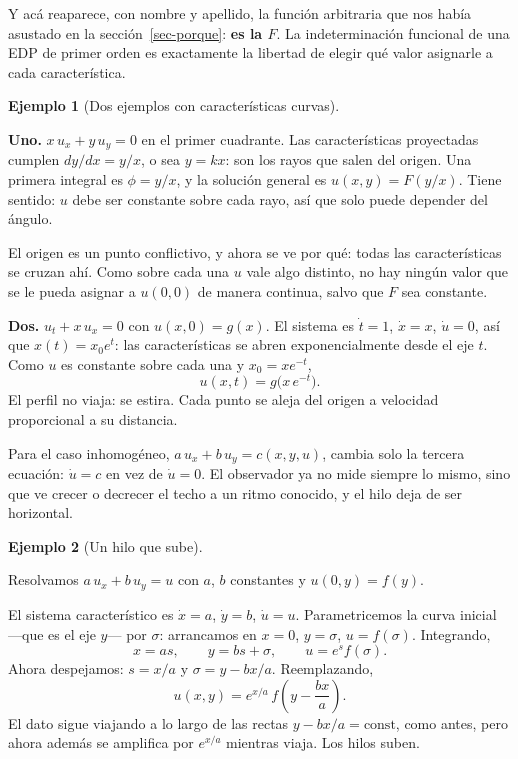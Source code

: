 \documentclass[
  spanish,
  a4paper,
]{scrbook}
\theoremstyle{definition}
\theoremstyle{plain}
\theoremstyle{definition}
\newtheorem{example}{Ejemplo}[chapter]
\theoremstyle{plain}
\theoremstyle{definition}
\theoremstyle{remark}
\begin{document}
Y acá reaparece, con nombre y apellido, la función arbitraria que nos
había asustado en la sección~\ref{sec-porque}: \textbf{es la \(F\)}. La
indeterminación funcional de una EDP de primer orden es exactamente la
libertad de elegir qué valor asignarle a cada característica.

\begin{example}[Dos ejemplos con características
curvas]\protect\hypertarget{exm-coef-variables}{}\label{exm-coef-variables}

\textbf{Uno.} \(x\,u_x + y\,u_y = 0\) en el primer cuadrante. Las
características proyectadas cumplen \(dy/dx = y/x\), o sea \(y = kx\):
son los rayos que salen del origen. Una primera integral es
\(\phi = y/x\), y la solución general es \(u(x,y) = F(y/x)\). Tiene
sentido: \(u\) debe ser constante sobre cada rayo, así que solo puede
depender del ángulo.

El origen es un punto conflictivo, y ahora se ve por qué: todas las
características se cruzan ahí. Como sobre cada una \(u\) vale algo
distinto, no hay ningún valor que se le pueda asignar a \(u(0,0)\) de
manera continua, salvo que \(F\) sea constante.

\textbf{Dos.} \(u_t + x\,u_x = 0\) con \(u(x,0)=g(x)\). El sistema es
\(\dot t = 1\), \(\dot x = x\), \(\dot u = 0\), así que
\(x(t) = x_0 e^{t}\): las características se abren exponencialmente
desde el eje \(t\). Como \(u\) es constante sobre cada una y
\(x_0 = x e^{-t}\), \[
u(x,t) = g\big(x\,e^{-t}\big) .
\] El perfil no viaja: se estira. Cada punto se aleja del origen a
velocidad proporcional a su distancia.

\end{example}

Para el caso inhomogéneo, \(a\,u_x + b\,u_y = c(x,y,u)\), cambia solo la
tercera ecuación: \(\dot u = c\) en vez de \(\dot u = 0\). El observador
ya no mide siempre lo mismo, sino que ve crecer o decrecer el techo a un
ritmo conocido, y el hilo deja de ser horizontal.

\begin{example}[Un hilo que
sube]\protect\hypertarget{exm-inhomogenea}{}\label{exm-inhomogenea}

Resolvamos \(a\,u_x + b\,u_y = u\) con \(a\), \(b\) constantes y
\(u(0,y) = f(y)\).

El sistema característico es \(\dot x = a\), \(\dot y = b\),
\(\dot u = u\). Parametricemos la curva inicial ---que es el eje
\(y\)--- por \(\sigma\): arrancamos en \(x=0\), \(y=\sigma\),
\(u=f(\sigma)\). Integrando, \[
x = a s, \qquad y = b s + \sigma, \qquad u = e^{s} f(\sigma) .
\] Ahora despejamos: \(s = x/a\) y \(\sigma = y - bx/a\). Reemplazando,
\[
u(x,y) = e^{x/a}\,f\!\left(y - \frac{bx}{a}\right).
\] El dato sigue viajando a lo largo de las rectas
\(y - bx/a = \text{const}\), como antes, pero ahora además se amplifica
por \(e^{x/a}\) mientras viaja. Los hilos suben.

\end{example}
\end{document}
